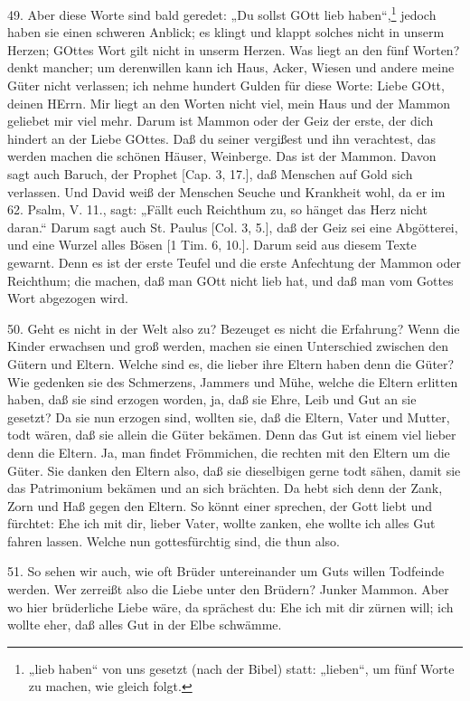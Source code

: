 49. Aber diese Worte sind bald geredet: „Du sollst GOtt lieb haben“,\footnote{„lieb haben“ von uns gesetzt (nach der Bibel) statt: „lieben“, um fünf Worte zu machen, wie gleich folgt.} jedoch haben sie einen schweren Anblick; es klingt und klappt solches nicht in unserm Herzen; GOttes Wort gilt nicht in unserm Herzen. Was liegt an den fünf Worten? denkt mancher; um derenwillen kann ich Haus, Acker, Wiesen und andere meine Güter nicht verlassen; ich nehme hundert Gulden für diese Worte: Liebe GOtt, deinen HErrn. Mir liegt an den Worten nicht viel, mein Haus und der Mammon geliebet mir viel mehr. Darum ist Mammon oder der Geiz der erste, der dich hindert an der Liebe GOttes. Daß du seiner vergißest und ihn verachtest, das werden machen die schönen Häuser, Weinberge. Das ist der Mammon. Davon sagt auch Baruch, der Prophet [Cap. 3, 17.], daß Menschen auf Gold sich verlassen. Und David weiß der Menschen Seuche und Krankheit wohl, da er im 62. Psalm, V. 11., sagt: „Fällt euch Reichthum zu, so hänget das Herz nicht daran.“ Darum sagt auch St. Paulus [Col. 3, 5.], daß der Geiz sei eine Abgötterei, und eine Wurzel alles Bösen [1 Tim. 6, 10.]. Darum seid aus diesem Texte gewarnt. Denn es ist der erste Teufel und die erste Anfechtung der Mammon oder Reichthum; die machen, daß man GOtt nicht lieb hat, und daß man vom Gottes Wort abgezogen wird.

50. Geht es nicht in der Welt also zu? Bezeuget es nicht die Erfahrung? Wenn die Kinder erwachsen und groß werden, machen sie einen Unterschied zwischen den Gütern und Eltern. Welche sind es, die lieber ihre Eltern haben denn die Güter? Wie gedenken sie des Schmerzens, Jammers und Mühe, welche die Eltern erlitten haben, daß sie sind erzogen worden, ja, daß sie Ehre, Leib und Gut an sie gesetzt? Da sie nun erzogen sind, wollten sie, daß die Eltern, Vater und Mutter, todt wären, daß sie allein die Güter bekämen. Denn das Gut ist einem viel lieber denn die Eltern. Ja, man findet Frömmichen, die rechten mit den Eltern um die Güter. Sie danken den Eltern also, daß sie dieselbigen gerne todt sähen, damit sie das Patrimonium bekämen und an sich brächten. Da hebt sich denn der Zank, Zorn und Haß gegen den Eltern. So könnt einer sprechen, der Gott liebt und fürchtet: Ehe ich mit dir, lieber Vater, wollte zanken, ehe wollte ich alles Gut fahren lassen. Welche nun gottesfürchtig sind, die thun also.

51. So sehen wir auch, wie oft Brüder untereinander um Guts willen Todfeinde werden. Wer zerreißt also die Liebe unter den Brüdern? Junker Mammon. Aber wo hier brüderliche Liebe wäre, da sprächest du: Ehe ich mit dir zürnen will; ich wollte eher, daß alles Gut in der Elbe schwämme.

